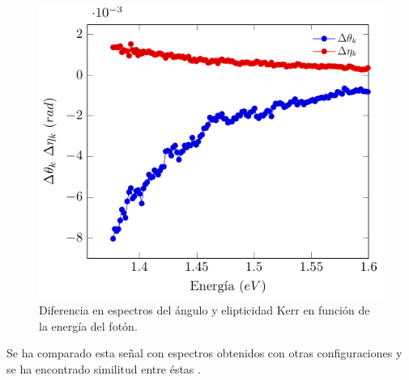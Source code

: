 \begin{figure}[!hbt]
	\centering
	\includegraphics[scale=1.3]{resexp/esp/difespectro.pdf}
	\caption[Diferencia de mediciones de $\theta_k$ y $\eta_k$]{Diferencia en espectros del \'angulo y elipticidad Kerr en funci\'on de la energ\'ia del fot\'on.}
	\label{Exp:fig:difespectroK}
\end{figure}
Se ha comparado esta se\~nal con espectros obtenidos con otras configuraciones y se ha encontrado similitud entre \'estas \cite{Hoffmann_2019}. 
\endinput